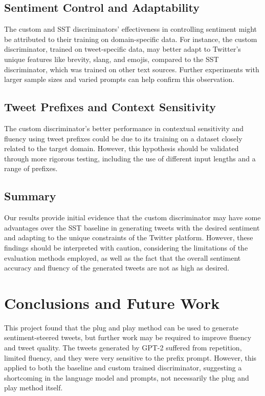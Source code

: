 \documentclass[11pt]{article}
\begin{document}
\subsection{Sentiment Control and Adaptability}
The custom and SST discriminators' effectiveness in controlling sentiment might be attributed to their training on domain-specific data. For instance, the custom discriminator, trained on tweet-specific data, may better adapt to Twitter's unique features like brevity, slang, and emojis, compared to the SST discriminator, which was trained on other text sources. Further experiments with larger sample sizes and varied prompts can help confirm this observation.

\subsection{Tweet Prefixes and Context Sensitivity}
The custom discriminator's better performance in contextual sensitivity and fluency using tweet prefixes could be due to its training on a dataset closely related to the target domain. However, this hypothesis should be validated through more rigorous testing, including the use of different input lengths and a range of prefixes. 

\subsection{Summary}
Our results provide initial evidence that the custom discriminator may have some advantages over the SST baseline in generating tweets with the desired sentiment and adapting to the unique constraints of the Twitter platform. However, these findings should be interpreted with caution, considering the limitations of the evaluation methods employed, as well as the fact that the overall sentiment accuracy and fluency of the generated tweets are not as high as desired. 


\section{Conclusions and Future Work}

This project found that the plug and play method can be used to generate sentiment-steered tweets, but further work may be required to improve fluency and tweet quality. The tweets generated by GPT-2 suffered from repetition, limited fluency, and they were very sensitive to the prefix prompt. However, this applied to both the baseline and custom trained discriminator, suggesting a shortcoming in the language model and prompts, not necessarily the plug and play method itself.
\end{document}
